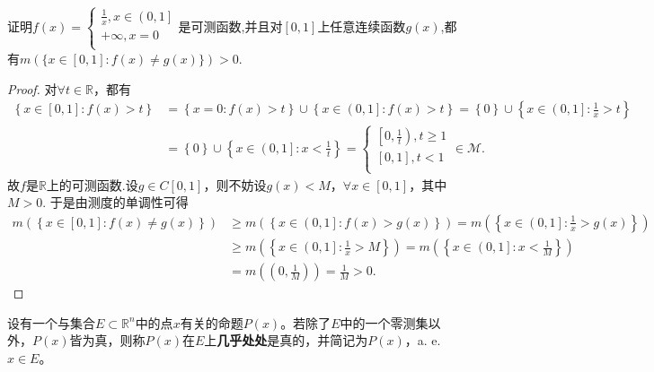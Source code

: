 \documentclass[../../main.tex]{subfiles}%
\begin{document}
\begin{example}
证明$f\left( x \right) =\begin{cases}
\frac{1}{x},x\in \left( 0,1 \right]\\
+\infty ,x=0\\
\end{cases}$是可测函数,并且对$[0,1]$上任意连续函数$g(x)$,都有$m(\{x\in [0,1]:f(x)\ne g(x)\})>0$.
\end{example}
\begin{proof}
对$\forall t\in \mathbb{R}$，都有
\begin{align*}
\left\{ x\in \left[ 0,1 \right] :f\left( x \right) >t \right\} &=\left\{ x=0:f\left( x \right) >t \right\} \cup \left\{ x\in \left( 0,1 \right] :f\left( x \right) >t \right\} =\left\{ 0 \right\} \cup \left\{ x\in \left( 0,1 \right] :\frac{1}{x}>t \right\} 
\\
&=\left\{ 0 \right\} \cup \left\{ x\in \left( 0,1 \right] :x<\frac{1}{t} \right\} =\begin{cases}
\left[ 0,\frac{1}{t} \right) ,t\geqslant 1\\
\left[ 0,1 \right] ,t<1\\
\end{cases}\in \mathscr{M} .
\end{align*}
故$f$是$\mathbb{R}$上的可测函数.设$g\in C\left[ 0,1 \right]$，则不妨设$g\left( x \right) <M$，$\forall x\in \left[ 0,1 \right]$，其中$M>0$.
于是由测度的单调性可得
\begin{align*}
m\left( \left\{ x\in \left[ 0,1 \right] :f\left( x \right) \ne g\left( x \right) \right\} \right) &\geqslant m\left( \left\{ x\in \left( 0,1 \right] :f\left( x \right) >g\left( x \right) \right\} \right) =m\left( \left\{ x\in \left( 0,1 \right] :\frac{1}{x}>g\left( x \right) \right\} \right) 
\\
&\geqslant m\left( \left\{ x\in \left( 0,1 \right] :\frac{1}{x}>M \right\} \right) =m\left( \left\{ x\in \left( 0,1 \right] :x<\frac{1}{M} \right\} \right) 
\\
&=m\left( \left( 0,\frac{1}{M} \right) \right) =\frac{1}{M}>0.
\end{align*}
\end{proof}

\begin{definition}
设有一个与集合$E \subset \mathbb{R}^n$中的点$x$有关的命题$P(x)$。若除了$E$中的一个零测集以外，$P(x)$皆为真，则称$P(x)$在$E$上\textbf{几乎处处}是真的，并简记为$P(x)$，a. e.$ x\in E$。
\end{definition}
\end{document}

